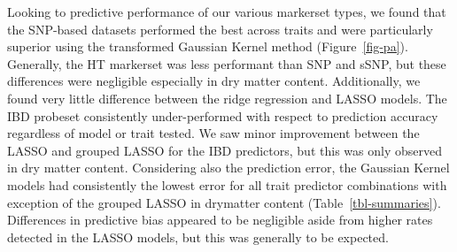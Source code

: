 Looking to predictive performance of our various markerset types, we
found that the SNP-based datasets performed the best across traits and
were particularly superior using the transformed Gaussian Kernel
method (Figure~\ref{fig-pa}). Generally, the HT markerset was less
performant than SNP and sSNP, but these differences were negligible
especially in dry matter content. Additionally, we found very little
difference between the ridge regression and LASSO models. The IBD
probeset consistently under-performed with respect to prediction
accuracy regardless of model or trait tested. We saw minor improvement
between the LASSO and grouped LASSO for the IBD predictors, but this was
only observed in dry matter content. Considering also the prediction
error, the Gaussian Kernel models had consistently the lowest error for
all trait predictor combinations with exception of the grouped LASSO in
drymatter content (Table~\ref{tbl-summaries}). Differences in predictive
bias appeared to be negligible aside from higher rates detected in the
LASSO models, but this was generally to be expected.

